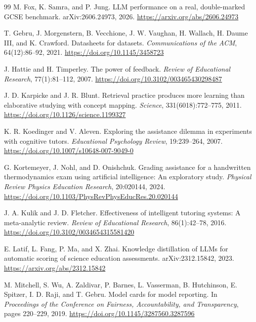\documentclass[11pt]{article}
\begin{document}
\begin{thebibliography}{99}
M. Fox, K. Samra, and P. Jung.
\newblock LLM performance on a real, double-marked GCSE benchmark.
\newblock arXiv:2606.24973, 2026.
\newblock \url{https://arxiv.org/abs/2606.24973}

T. Gebru, J. Morgenstern, B. Vecchione, J. W. Vaughan, H. Wallach, H. Daume III, and K. Crawford.
\newblock Datasheets for datasets.
\newblock \textit{Communications of the ACM}, 64(12):86--92, 2021.
\newblock \url{https://doi.org/10.1145/3458723}

J. Hattie and H. Timperley.
\newblock The power of feedback.
\newblock \textit{Review of Educational Research}, 77(1):81--112, 2007.
\newblock \url{https://doi.org/10.3102/003465430298487}

J. D. Karpicke and J. R. Blunt.
\newblock Retrieval practice produces more learning than elaborative studying with concept mapping.
\newblock \textit{Science}, 331(6018):772--775, 2011.
\newblock \url{https://doi.org/10.1126/science.1199327}

K. R. Koedinger and V. Aleven.
\newblock Exploring the assistance dilemma in experiments with cognitive tutors.
\newblock \textit{Educational Psychology Review}, 19:239--264, 2007.
\newblock \url{https://doi.org/10.1007/s10648-007-9049-0}

G. Kortemeyer, J. Nohl, and D. Onishchuk.
\newblock Grading assistance for a handwritten thermodynamics exam using artificial intelligence: An exploratory study.
\newblock \textit{Physical Review Physics Education Research}, 20:020144, 2024.
\newblock \url{https://doi.org/10.1103/PhysRevPhysEducRes.20.020144}

J. A. Kulik and J. D. Fletcher.
\newblock Effectiveness of intelligent tutoring systems: A meta-analytic review.
\newblock \textit{Review of Educational Research}, 86(1):42--78, 2016.
\newblock \url{https://doi.org/10.3102/0034654315581420}

E. Latif, L. Fang, P. Ma, and X. Zhai.
\newblock Knowledge distillation of LLMs for automatic scoring of science education assessments.
\newblock arXiv:2312.15842, 2023.
\newblock \url{https://arxiv.org/abs/2312.15842}

M. Mitchell, S. Wu, A. Zaldivar, P. Barnes, L. Vasserman, B. Hutchinson, E. Spitzer, I. D. Raji, and T. Gebru.
\newblock Model cards for model reporting.
\newblock In \textit{Proceedings of the Conference on Fairness, Accountability, and Transparency}, pages 220--229, 2019.
\newblock \url{https://doi.org/10.1145/3287560.3287596}


\end{thebibliography}
\end{document}
